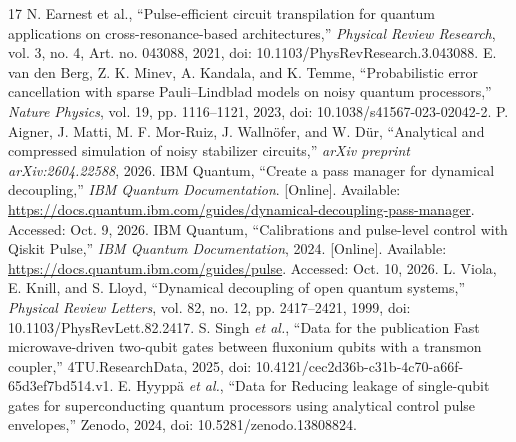 \documentclass[10pt,letterpaper,journal]{IEEEtran}
\begin{document}
\begin{thebibliography}{17}
 N. Earnest et al., ``Pulse-efficient circuit transpilation for quantum applications on cross-resonance-based architectures,'' \emph{Physical Review Research}, vol. 3, no. 4, Art. no. 043088, 2021, doi: 10.1103/PhysRevResearch.3.043088.
 E. van den Berg, Z. K. Minev, A. Kandala, and K. Temme, ``Probabilistic error cancellation with sparse Pauli--Lindblad models on noisy quantum processors,'' \emph{Nature Physics}, vol. 19, pp. 1116--1121, 2023, doi: 10.1038/s41567-023-02042-2.
 P. Aigner, J. Matti, M. F. Mor-Ruiz, J. Walln\"ofer, and W. D\"ur, ``Analytical and compressed simulation of noisy stabilizer circuits,'' \emph{arXiv preprint arXiv:2604.22588}, 2026.
 IBM Quantum, ``Create a pass manager for dynamical decoupling,'' \emph{IBM Quantum Documentation}. [Online]. Available: \url{https://docs.quantum.ibm.com/guides/dynamical-decoupling-pass-manager}. Accessed: Oct. 9, 2026.
 IBM Quantum, ``Calibrations and pulse-level control with Qiskit Pulse,'' \emph{IBM Quantum Documentation}, 2024. [Online]. Available: \url{https://docs.quantum.ibm.com/guides/pulse}. Accessed: Oct. 10, 2026.
 L. Viola, E. Knill, and S. Lloyd, ``Dynamical decoupling of open quantum systems,'' \emph{Physical Review Letters}, vol. 82, no. 12, pp. 2417--2421, 1999, doi: 10.1103/PhysRevLett.82.2417.
 S. Singh \emph{et al.}, ``Data for the publication Fast microwave-driven two-qubit gates between fluxonium qubits with a transmon coupler,'' 4TU.ResearchData, 2025, doi: 10.4121/cec2d36b-c31b-4c70-a66f-65d3ef7bd514.v1.
 E. Hyypp\"a \emph{et al.}, ``Data for Reducing leakage of single-qubit gates for superconducting quantum processors using analytical control pulse envelopes,'' Zenodo, 2024, doi: 10.5281/zenodo.13808824.
\end{thebibliography}
\end{document}
